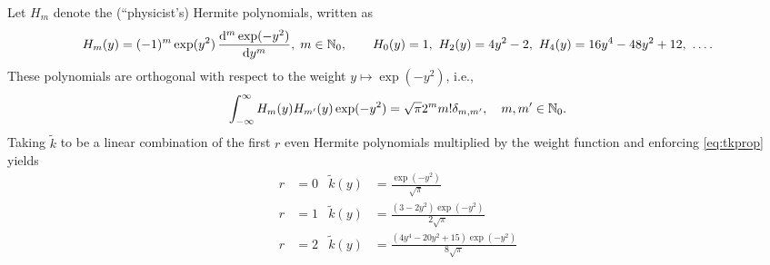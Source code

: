 \documentclass[letterpaper]{amsart}
\newcommand{\tk}{\tilde{k}}
\begin{document}
Let $H_m$ denote the (``physicist's) Hermite polynomials, written as
\begin{equation*}
	H_m(y) = (-1)^m \exp(y^2) \, \frac{\dif^m \exp(-y^2)}{\dif y^m}, \; m \in \natzero, \qquad
	H_0(y) = 1, \ H_2(y) = 4y^2-2, \ H_4(y) = 16 y^4 - 48 y^2 + 12, \ \ldots.
\end{equation*}
These polynomials are orthogonal with respect to the weight $y \mapsto \exp(-y^2)$, i.e.,
\begin{equation*}
	\int_{-\infty}^{\infty} H_m(y) H_{m'}(y) \exp(-y^2) = \sqrt{\pi} 2^m m! \delta_{m,m'}, \quad m,m' \in \mathbb{N}_{0}.
\end{equation*}
Taking $\tk$ to be a linear combination of the first $r$ even Hermite polynomials multiplied by the weight function and enforcing \eqref{eq:tkprop} yields
\begin{align*}
	r& = 0  & \tk(y) &= \frac{\exp(-y^2)}{\sqrt{\pi}}
		\\
	r& = 1 &  \tk(y) & =\frac{\left(3 - 2y^{2}\right) \exp(- y^{2})}{2\sqrt{\pi}} \\
	r &= 2 & \tk(y) & = \frac{\left(4 y^{4} - 20 y^{2} + 15\right) \exp(- y^{2})}{8 \sqrt{\pi}}
\end{align*}
\end{document}
